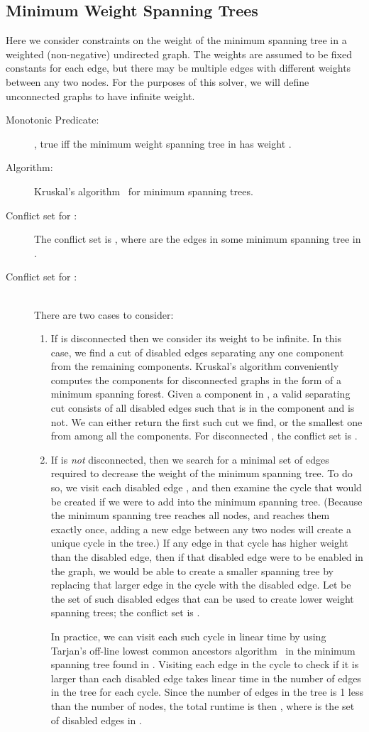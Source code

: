 \documentclass[runningheads]{llncs}
\begin{document}
\subsection{{Minimum Weight Spanning Trees}}
Here we consider constraints on the weight of the minimum spanning tree in a weighted (non-negative) undirected graph. The weights are assumed to be fixed constants for each edge, but there may be multiple edges with different weights between any two nodes. For the purposes of this solver, we will define unconnected graphs to have infinite weight. 
\begin{description}
\item[Monotonic Predicate:] , true iff the minimum weight spanning tree in  has weight .
\item[Algorithm:] Kruskal's algorithm~\cite{kruskal1956shortest} for minimum spanning trees.
\item[Conflict set for :] The conflict set is , where  are the edges in some minimum spanning tree in .
\item[Conflict set for :]~\\There are two cases to consider:
\begin{enumerate}
\item If  is disconnected then we consider its weight to be infinite. In this case, we find a  cut  of disabled edges separating any one component from the remaining components. Kruskal's algorithm conveniently computes the components for disconnected graphs in the form of a minimum spanning forest. Given a component in , a valid separating cut consists of all disabled edges  such that  is in the component and  is not. We can either return the first such cut we find, or the smallest one from among all the components. For disconnected , the conflict set is  .


\item If  is \textit{not} disconnected, then we search for a minimal set of edges required to decrease the weight of the minimum spanning tree. To do so, we visit each disabled edge , and then examine the cycle that would be created if we were to add  into the minimum spanning tree. (Because the minimum spanning tree reaches all nodes, and reaches them exactly once, adding a new edge between any two nodes will create a unique cycle in the tree.) If any edge in that cycle has higher weight than the disabled edge, then if that disabled edge were to be enabled in the graph, we would be able to create a smaller spanning tree by replacing that larger edge in the cycle with the disabled edge. Let  be the set of such disabled edges that can be used to create lower weight spanning trees; the conflict set is .


In practice, we can visit each such cycle in linear time by using Tarjan's off-line lowest common ancestors algorithm~\cite{gabow1985linear} in the minimum spanning tree found in . Visiting each edge in the cycle to check if it is larger than each disabled edge takes linear time in the number of edges in the tree for each cycle. Since the number of edges in the tree is 1 less than the number of nodes, the total runtime is then , where  is the set of disabled edges in .
\end{enumerate}
\end{description}
\end{document}
